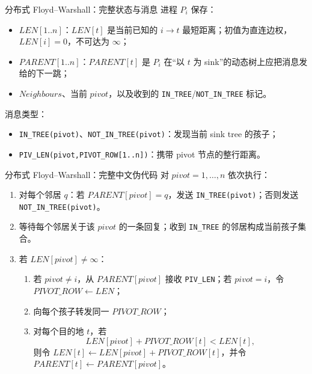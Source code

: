 \documentclass[UTF8,fontset=none,aspectratio=169,10pt]{beamer}
\begin{document}
{\begin{frame}{分布式 Floyd--Warshall：完整状态与消息}
\small
进程 $P_i$ 保存：
\begin{itemize}
  \item $LEN[1..n]$：$LEN[t]$ 是当前已知的 $i\rightarrow t$ 最短距离；初值为直连边权，$LEN[i]=0$，不可达为 $\infty$；
  \item $PARENT[1..n]$：$PARENT[t]$ 是 $P_i$ 在“以 $t$ 为 sink”的动态树上应把消息发给的下一跳；
  \item $Neighbours$、当前 $pivot$，以及收到的 \texttt{IN\_TREE}/\texttt{NOT\_IN\_TREE} 标记。
\end{itemize}
消息类型：
\begin{itemize}
  \item \texttt{IN\_TREE(pivot)}、\texttt{NOT\_IN\_TREE(pivot)}：发现当前 sink tree 的孩子；
  \item \texttt{PIV\_LEN(pivot,PIVOT\_ROW[1..n])}：携带 pivot 节点的整行距离。
\end{itemize}
\end{frame}

\begin{frame}{分布式 Floyd--Warshall：完整中文伪代码}
\scriptsize
对 $pivot=1,\ldots,n$ 依次执行：
\begin{enumerate}
  \item 对每个邻居 $q$：若 $PARENT[pivot]=q$，发送 \texttt{IN\_TREE(pivot)}；否则发送 \texttt{NOT\_IN\_TREE(pivot)}。
  \item 等待每个邻居关于该 $pivot$ 的一条回复；收到 \texttt{IN\_TREE} 的邻居构成当前孩子集合。
  \item 若 $LEN[pivot]\neq\infty$：
    \begin{enumerate}
      \item 若 $pivot\neq i$，从 $PARENT[pivot]$ 接收 \texttt{PIV\_LEN}；若 $pivot=i$，令 $PIVOT\_ROW\leftarrow LEN$；
      \item 向每个孩子转发同一 $PIVOT\_ROW$；
      \item 对每个目的地 $t$，若
      \[
      LEN[pivot]+PIVOT\_ROW[t]<LEN[t],
      \]
      则令 $LEN[t]\leftarrow LEN[pivot]+PIVOT\_ROW[t]$，并令 $PARENT[t]\leftarrow PARENT[pivot]$。
    \end{enumerate}
\end{enumerate}
\end{frame}

}
\end{document}
